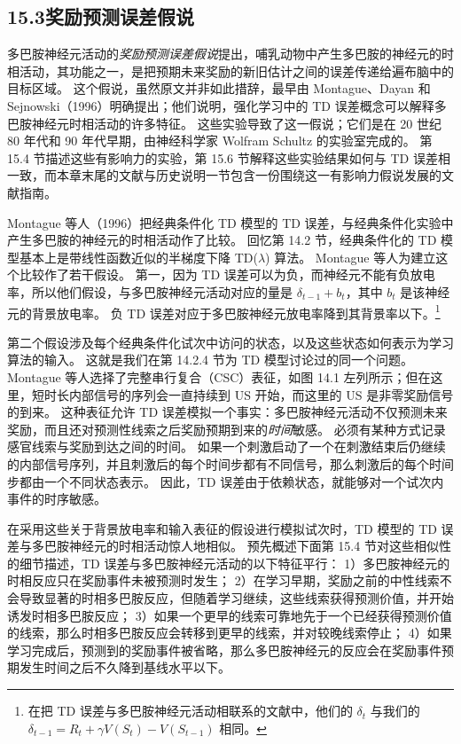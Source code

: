 \documentclass[UTF8,12pt,a4paper,fontset=fandol]{ctexart}
\begin{document}
\subsection*{15.3\quad 奖励预测误差假说}

多巴胺神经元活动的\textit{奖励预测误差假说}提出，哺乳动物中产生多巴胺的神经元的时相活动，其功能之一，是把预期未来奖励的新旧估计之间的误差传递给遍布脑中的目标区域。
这个假说，虽然原文并非如此措辞，最早由 Montague、Dayan 和 Sejnowski（1996）明确提出；他们说明，强化学习中的 TD 误差概念可以解释多巴胺神经元时相活动的许多特征。
这些实验导致了这一假说；它们是在 20 世纪 80 年代和 90 年代早期，由神经科学家 Wolfram Schultz 的实验室完成的。
第 15.4 节描述这些有影响力的实验，第 15.6 节解释这些实验结果如何与 TD 误差相一致，而本章末尾的文献与历史说明一节包含一份围绕这一有影响力假说发展的文献指南。

Montague 等人（1996）把经典条件化 TD 模型的 TD 误差，与经典条件化实验中产生多巴胺的神经元的时相活动作了比较。
回忆第 14.2 节，经典条件化的 TD 模型基本上是带线性函数近似的半梯度下降 TD($\lambda$) 算法。
Montague 等人为建立这个比较作了若干假设。
第一，因为 TD 误差可以为负，而神经元不能有负放电率，所以他们假设，与多巴胺神经元活动对应的量是 $\delta_{t-1}+b_t$，其中 $b_t$ 是该神经元的背景放电率。
负 TD 误差对应于多巴胺神经元放电率降到其背景率以下。\footnote{在把 TD 误差与多巴胺神经元活动相联系的文献中，他们的 $\delta_t$ 与我们的 $\delta_{t-1}=R_t+\gamma V(S_t)-V(S_{t-1})$ 相同。}

第二个假设涉及每个经典条件化试次中访问的状态，以及这些状态如何表示为学习算法的输入。
这就是我们在第 14.2.4 节为 TD 模型讨论过的同一个问题。
Montague 等人选择了完整串行复合（CSC）表征，如图 14.1 左列所示；但在这里，短时长内部信号的序列会一直持续到 US 开始，而这里的 US 是非零奖励信号的到来。
这种表征允许 TD 误差模拟一个事实：多巴胺神经元活动不仅预测未来奖励，而且还对预测性线索之后奖励预期到来的\textit{时间}敏感。
必须有某种方式记录感官线索与奖励到达之间的时间。
如果一个刺激启动了一个在刺激结束后仍继续的内部信号序列，并且刺激后的每个时间步都有不同信号，那么刺激后的每个时间步都由一个不同状态表示。
因此，TD 误差由于依赖状态，就能够对一个试次内事件的时序敏感。

在采用这些关于背景放电率和输入表征的假设进行模拟试次时，TD 模型的 TD 误差与多巴胺神经元的时相活动惊人地相似。
预先概述下面第 15.4 节对这些相似性的细节描述，TD 误差与多巴胺神经元活动的以下特征平行：
1）多巴胺神经元的时相反应只在奖励事件未被预测时发生；
2）在学习早期，奖励之前的中性线索不会导致显著的时相多巴胺反应，但随着学习继续，这些线索获得预测价值，并开始诱发时相多巴胺反应；
3）如果一个更早的线索可靠地先于一个已经获得预测价值的线索，那么时相多巴胺反应会转移到更早的线索，并对较晚线索停止；
4）如果学习完成后，预测到的奖励事件被省略，那么多巴胺神经元的反应会在奖励事件预期发生时间之后不久降到基线水平以下。
\end{document}
